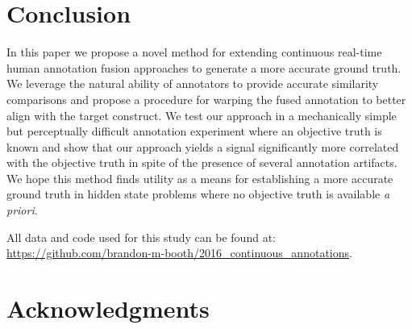 \documentclass[10pt,letterpaper]{article}
\begin{document}
\section*{Conclusion}
In this paper we propose a novel method for extending continuous real-time human annotation fusion approaches to generate a more accurate ground truth.  We leverage the natural ability of annotators to provide accurate similarity comparisons and propose a procedure for warping the fused annotation to better align with the target construct.  We test our approach in a mechanically simple but perceptually difficult annotation experiment where an objective truth is known and show that our approach yields a signal significantly more correlated with the objective truth in spite of the presence of several annotation artifacts.  We hope this method finds utility as a means for establishing a more accurate ground truth in hidden state problems where no objective truth is available \textit{a priori}.

All data and code used for this study can be found at: \href{https://github.com/brandon-m-booth/2016_continuous_annotations}{https://github.com/brandon-m-booth/2016\_continuous\_annotations}.

\section*{Acknowledgments}




\end{document}
